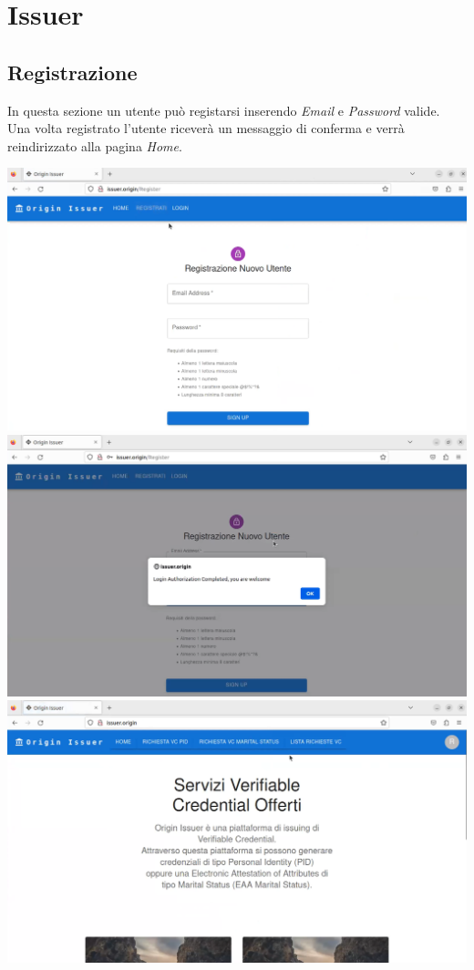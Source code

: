 \section{Issuer}

\subsection{Registrazione}
In questa sezione un utente può registarsi inserendo \textit{Email} e \textit{Password} valide. Una volta registrato l'utente riceverà un messaggio di conferma e verrà reindirizzato alla pagina \textit{Home}.
\begin{center}
\includegraphics[scale = 0.2]{./res/img/issuer/new/registrazione.png}
\includegraphics[scale = 0.2]{./res/img/issuer/new/registrazione2.png}
\includegraphics[scale = 0.2]{./res/img/issuer/new/registrazione3.png}
\end{center}

